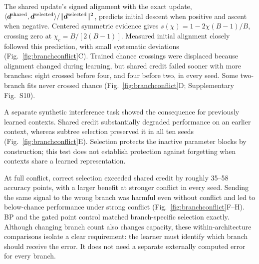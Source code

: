 \documentclass[11pt]{article}
\begin{document}
The shared update's signed alignment with the exact update, $\langle\bm d^{\rm shared},\bm d^{\rm selected}\rangle/\|\bm d^{\rm selected}\|^2$, predicts initial descent when positive and ascent when negative. Centered symmetric evidence gives $s(\chi)=1-2\chi(B-1)/B$, crossing zero at $\chi_c=B/[2(B-1)]$. Measured initial alignment closely followed this prediction, with small systematic deviations (Fig.~\ref{fig:branchconflict}C). Trained chance crossings were displaced because alignment changed during learning, but shared credit failed sooner with more branches: eight crossed before four, and four before two, in every seed. Some two-branch fits never crossed chance (Fig.~\ref{fig:branchconflict}D; Supplementary Fig.~S10).

A separate synthetic interference task showed the consequence for previously learned contexts. Shared credit substantially degraded performance on an earlier context, whereas subtree selection preserved it in all ten seeds (Fig.~\ref{fig:branchconflict}E). Selection protects the inactive parameter blocks by construction; this test does not establish protection against forgetting when contexts share a learned representation.

At full conflict, correct selection exceeded shared credit by roughly 35--58 accuracy points, with a larger benefit at stronger conflict in every seed. Sending the same signal to the wrong branch was harmful even without conflict and led to below-chance performance under strong conflict (Fig.~\ref{fig:branchconflict}F--H). BP and the gated point control matched branch-specific selection exactly. Although changing branch count also changes capacity, these within-architecture comparisons isolate a clear requirement: the learner must identify which branch should receive the error. It does not need a separate externally computed error for every branch.
\end{document}
